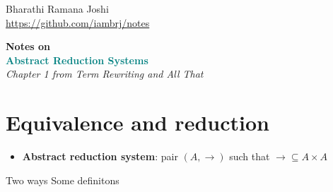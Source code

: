 \documentclass[titlepage, 12pt]{article}
\begin{document}
\begin{titlepage}

	\raggedleft

	\vspace*{\baselineskip}

	{Bharathi Ramana Joshi\\\url{https://github.com/iambrj/notes}}

	\vspace*{0.167\textheight}

	\textbf{\LARGE Notes on}\\[\baselineskip]

	\textbf{\textcolor{teal}{\huge Abstract Reduction Systems}}\\[\baselineskip]

    {\Large \textit{Chapter 1 from Term Rewriting and All That}}

	\vfill

	\vspace*{3\baselineskip}

\end{titlepage}

\section{Equivalence and reduction}

\begin{itemize}

  \item\textbf{Abstract reduction system}: pair $(A,\rightarrow)$ such that
    $\rightarrow\subseteq A\times A$
\end{itemize}
Two ways 
Some definitons
\end{document}
